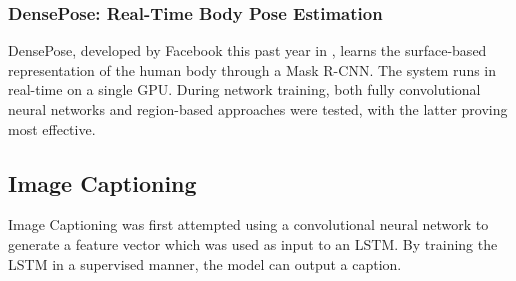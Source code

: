 \subsubsection{DensePose: Real-Time Body Pose Estimation}
DensePose, developed by Facebook this past year in \cite{DBLP:journals/corr/abs-1809-01995}, learns the surface-based representation of the human body through a Mask R-CNN.
The system runs in real-time on a single GPU.
During network training, both fully convolutional neural networks and region-based approaches were tested, with the latter proving most effective. 

\subsection{Image Captioning}
Image Captioning was first attempted using a convolutional neural network to generate a feature vector which was used as input to an LSTM.
By training the LSTM in a supervised manner, the model can output a caption.
